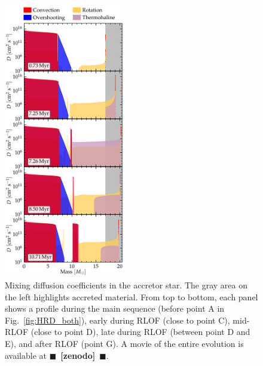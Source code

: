 \documentclass[twocolumn,twocolappendix,trackchanges]{aastex63}
\DeclareRobustCommand{\Figref}[1]{Fig.~\ref{#1}}
\newcommand{\todo}[1]{{\large $\blacksquare$~\textbf{\color{red}[#1]}}~$\blacksquare$}
\begin{document}
\begin{figure}[htbp]
  \includegraphics[width=0.47\textwidth]{D_mix_vertical}
  \caption{Mixing diffusion coefficients in the accretor star. The
    gray area on the left highlights accreted material. From
    top to bottom, each panel shows a profile during the main sequence
    (before point A in \Figref{fig:HRD_both}),
    early during RLOF (close to point C), mid-RLOF (close to
    point D), late during RLOF (between point D and E), and after RLOF
    (point G). A movie of the entire evolution is available at \todo{zenodo}.}
  \label{fig:D_mix}
\end{figure}
\end{document}
